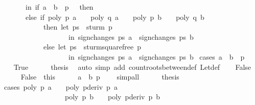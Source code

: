 \begin{isabellebody}
\ \ \ \ \ \ \ in\ if\ a\ {\isachargreater}\ b\ {\isasymor}\ p\ {\isacharequal}\ {}\ then\ {}\isanewline
\ \ \ \ \ \ \ else\ if\ {\isacharparenleft}poly\ p\ a\ {\isasymnoteq}\ {}\ {\isasymor}\ poly\ q\ a\ {\isasymnoteq}\ {}{\isacharparenright}\ {\isasymand}\ {\isacharparenleft}poly\ p\ b\ {\isasymnoteq}\ {}\ {\isasymor}\ poly\ q\ b\ {\isasymnoteq}\ {}{\isacharparenright}\isanewline
\ \ \ \ \ \ \ \ \ \ \ \ then\ {\isacharparenleft}let\ ps\ {\isacharequal}\ sturm\ p\ \isanewline
\ \ \ \ \ \ \ \ \ \ \ \ \ \ \ \ \ \ \ in\ sign{\isacharunderscore}changes\ ps\ a\ {\isacharminus}\ sign{\isacharunderscore}changes\ ps\ b{\isacharparenright}\isanewline
\ \ \ \ \ \ \ \ \ \ \ \ else\ {\isacharparenleft}let\ ps\ {\isacharequal}\ sturm{\isacharunderscore}squarefree\ p\isanewline
\ \ \ \ \ \ \ \ \ \ \ \ \ \ \ \ \ \ \ in\ sign{\isacharunderscore}changes\ ps\ a\ {\isacharminus}\ sign{\isacharunderscore}changes\ ps\ b{\isacharparenright}{\isacharparenright}{\isachardoublequoteclose}\isanewline
%
\isadelimproof
%
\endisadelimproof
%
\isatagproof
{}\isamarkupfalse%
\ {\isacharparenleft}cases\ {\isachardoublequoteopen}a\ {\isachargreater}\ b\ {\isasymor}\ p\ {\isacharequal}\ {}{\isachardoublequoteclose}{\isacharparenright}\isanewline
\ \ \isamarkupfalse%
\ True\isanewline
\ \ \ \ \isamarkupfalse%
\ {\isacharquery}thesis\ \isamarkupfalse%
\ {\isacharparenleft}auto\ simp\ add{\isacharcolon}\ count{\isacharunderscore}roots{\isacharunderscore}between{\isacharunderscore}def\ Let{\isacharunderscore}def{\isacharparenright}\isanewline
{}\isamarkupfalse%
\isanewline
\ \ \isamarkupfalse%
\ False\isanewline
\ \ \ \ \isamarkupfalse%
\ False{}\ {\isacharequal}\ this\isanewline
\ \ \ \ \isamarkupfalse%
\ {\isachardoublequoteopen}a\ {\isasymle}\ b{\isachardoublequoteclose}\ {\isachardoublequoteopen}p\ {\isasymnoteq}\ {}{\isachardoublequoteclose}\ \isamarkupfalse%
\ simp{\isacharunderscore}all\isanewline
\ \ \ \ \isamarkupfalse%
\ {\isacharquery}thesis\isanewline
\ \ \ \ \isamarkupfalse%
\ {\isacharparenleft}cases\ {\isachardoublequoteopen}{\isacharparenleft}poly\ p\ a\ {\isasymnoteq}\ {}\ {\isasymor}\ poly\ {\isacharparenleft}pderiv\ p{\isacharparenright}\ a\ {\isasymnoteq}\ {}{\isacharparenright}\ {\isasymand}\ \isanewline
\ \ \ \ \ \ \ \ \ \ \ \ \ \ \ \ \ \ {\isacharparenleft}poly\ p\ b\ {\isasymnoteq}\ {}\ {\isasymor}\ poly\ {\isacharparenleft}pderiv\ p{\isacharparenright}\ b\ {\isasymnoteq}\ {}{\isacharparenright}{\isachardoublequoteclose}{\isacharparenright}\isanewline

\end{isabellebody}
